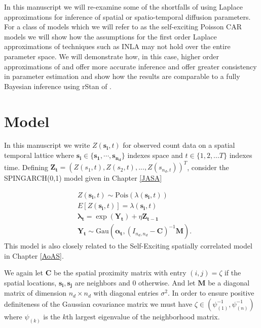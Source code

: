 \documentclass[11pt]{isuthesis}
\begin{document}
	In this manuscript we will re-examine some of the shortfalls of using Laplace approximations for inference of spatial or spatio-temporal diffusion parameters.  For a class of models which we will refer to as the self-exciting Poisson CAR models we will show how the assumptions for the first order Laplace approximations of techniques such as INLA may not hold over the entire parameter space.  We will demonstrate how, in this case, higher order approximations of \cite{shun1995laplace} and \cite{evangelou2011estimation} offer more accurate inference and offer greater consistency in parameter estimation and show how the results are comparable to a fully Bayesian inference using rStan of \cite{gelman2015stan}.
	
	
	\section{Model}
	
	
	
	
	
	In this manuscript we write $Z(\boldsymbol{s_i},t)$ for observed count data on a spatial temporal lattice where $\boldsymbol{s_i} \in \{\boldsymbol{s_1},\cdots,\boldsymbol{s_{n_d}}\}$ indexes space and $t\in\{1,2,...T\}$ indexes time.  Defining $\boldsymbol{Z_t} = (Z(s_1,t),Z(s_2,t),...,Z(s_{n_d,t}))^T$, consider the SPINGARCH(0,1) model given in Chapter \ref{JASA}
	
	\begin{align}
	& Z(\boldsymbol{s_i},t) \sim \mbox{Pois}(\lambda(\boldsymbol{s_i},t)) \label{eq:timeseries} \\
	& E[Z(\boldsymbol{s_i},t)]=\lambda(\boldsymbol{s_i},t)\nonumber\\
	& \boldsymbol{\lambda_t} = \exp(\boldsymbol{Y_t})+\eta \boldsymbol{Z_{t-1}}\nonumber\\
	& \boldsymbol{Y_t} \sim \mbox{Gau}\textit{} (\boldsymbol{\alpha_t},(I_{{n_d},{n_d}}-\boldsymbol{C})^{-1}\boldsymbol{M})\nonumber.
	\end{align}
	This model is also closely related to the Self-Exciting spatially correlated model in Chapter \ref{AoAS}.
	
	We again let $\boldsymbol{C}$ be the spatial proximity matrix with entry $(i,j)=\zeta$ if the spatial locations, $\boldsymbol{s_i},\boldsymbol{s_j}$ are neighbors and $0$ otherwise.  And let $\boldsymbol{M}$ be a diagonal matrix of dimension $n_d \times n_d$ with diagonal entries $\sigma^2$.  In order to ensure positive definiteness of the Gaussian covariance matrix we must have $\zeta \in (\psi_{(1)}^{-1},\psi_{(n)}^{-1})$ where $\psi_{(k)}$ is the $k$th largest eigenvalue of the neighborhood matrix.   
	
\end{document}
